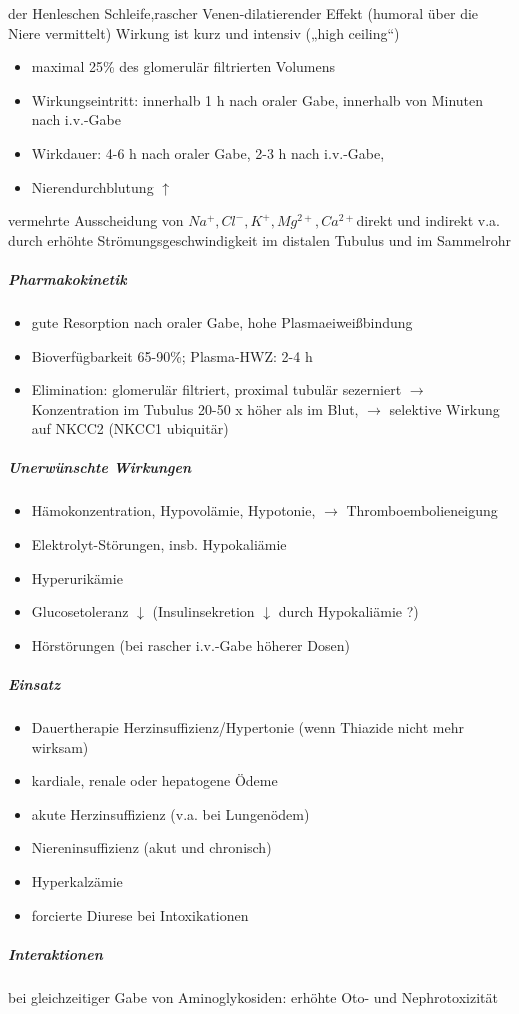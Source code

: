 \documentclass[10pt,a4paper]{report}
\begin{document}
der Henleschen Schleife,rascher Venen-dilatierender Effekt (humoral über die Niere vermittelt)	Wirkung ist kurz und intensiv („high ceiling“)
\begin{itemize}
	\item maximal 25\% des glomerulär filtrierten Volumens
	\item Wirkungseintritt: innerhalb 1 h nach oraler Gabe, innerhalb von Minuten nach i.v.-Gabe
	\item Wirkdauer:	4-6 h nach oraler Gabe, 2-3 h nach i.v.-Gabe, 
	\item Nierendurchblutung $\uparrow$
\end{itemize}
vermehrte Ausscheidung von $Na^+, Cl^-, K^+, Mg^{2+}, Ca^{2+}$direkt und indirekt v.a. durch erhöhte Strömungsgeschwindigkeit im distalen Tubulus und im Sammelrohr
\subparagraph{Pharmakokinetik}
\begin{itemize}
	\item gute Resorption nach oraler Gabe, hohe Plasmaeiweißbindung
	\item Bioverfügbarkeit 65-90\%; Plasma-HWZ: 2-4 h
	\item Elimination:	glomerulär filtriert, proximal tubulär sezerniert $\rightarrow$ Konzentration im Tubulus 20-50 x höher als im Blut, $\rightarrow$ selektive Wirkung auf NKCC2 (NKCC1 ubiquitär)
\end{itemize}
\subparagraph{Unerwünschte Wirkungen}
\begin{itemize}
	\item Hämokonzentration, Hypovolämie, Hypotonie, $\rightarrow$ Thromboembolieneigung
	\item Elektrolyt-Störungen, insb. Hypokaliämie
	\item Hyperurikämie    
	\item Glucosetoleranz $\downarrow$ (Insulinsekretion $\downarrow$ durch Hypokaliämie ?)
	\item Hörstörungen (bei rascher i.v.-Gabe höherer Dosen)
\end{itemize}
\subparagraph{Einsatz}
\begin{itemize}
	\item Dauertherapie Herzinsuffizienz/Hypertonie (wenn Thiazide nicht mehr wirksam)
	\item kardiale, renale oder hepatogene Ödeme
	\item akute Herzinsuffizienz (v.a. bei Lungenödem)
	\item Niereninsuffizienz (akut und chronisch)
	\item Hyperkalzämie
	\item forcierte Diurese bei Intoxikationen
\end{itemize}
\subparagraph{Interaktionen}
bei gleichzeitiger Gabe von Aminoglykosiden: erhöhte Oto- und Nephrotoxizität
\end{document}
